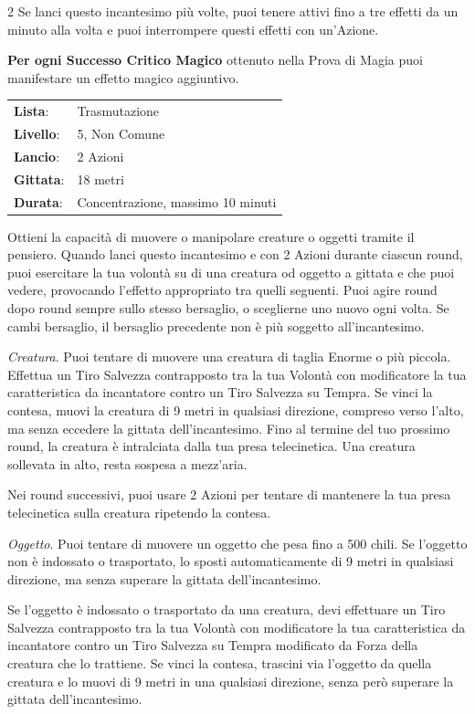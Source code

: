 \begin{multicols}{2}
Se lanci questo incantesimo più volte, puoi tenere attivi fino a tre effetti da un minuto alla volta e puoi interrompere questi effetti con un'Azione.

\textbf{Per ogni Successo Critico Magico} ottenuto nella Prova di Magia puoi manifestare un effetto magico aggiuntivo.

\noindent\begin{tabularx}{\linewidth}{p{1.9cm}X}
	\rowcolor{gray!20}\textbf{Lista}: & Trasmutazione \\
	\textbf{Livello}: & 5, Non Comune \\
	\rowcolor{gray!20}\textbf{Lancio}: & 2 Azioni \\
	\textbf{Gittata}: & 18 metri \\
	\rowcolor{gray!20}\textbf{Durata}: & Concentrazione, massimo 10 minuti \\
\end{tabularx}\smallskip

Ottieni la capacità di muovere o manipolare creature o oggetti tramite il pensiero. Quando lanci questo incantesimo e con 2 Azioni durante ciascun round, puoi esercitare la tua volontà su di una creatura od oggetto a gittata e che puoi vedere, provocando l'effetto appropriato tra quelli seguenti. Puoi agire round dopo round sempre sullo stesso bersaglio, o sceglierne uno nuovo ogni volta. Se cambi bersaglio, il bersaglio precedente non è più soggetto all'incantesimo.

\emph{Creatura}. Puoi tentare di muovere una creatura di taglia Enorme o più piccola. Effettua un Tiro Salvezza contrapposto tra la tua Volontà con modificatore la tua caratteristica da incantatore contro un Tiro Salvezza su Tempra. Se vinci la contesa, muovi la creatura di 9 metri in qualsiasi direzione, compreso verso l'alto, ma senza eccedere la gittata dell'incantesimo. Fino al termine del tuo prossimo round, la creatura è intralciata dalla tua presa telecinetica. Una creatura sollevata in alto, resta sospesa a mezz'aria.

Nei round successivi, puoi usare 2 Azioni per tentare di mantenere la tua presa telecinetica sulla creatura ripetendo la contesa.

\emph{Oggetto}. Puoi tentare di muovere un oggetto che pesa fino a 500 chili. Se l'oggetto non è indossato o trasportato, lo sposti automaticamente di 9 metri in qualsiasi direzione, ma senza superare la gittata dell'incantesimo.

Se l'oggetto è indossato o trasportato da una creatura, devi effettuare un Tiro Salvezza contrapposto tra la tua Volontà con modificatore la tua caratteristica da incantatore contro un Tiro Salvezza su Tempra modificato da Forza della creatura che lo trattiene. Se vinci la contesa, trascini via l'oggetto da quella creatura e lo muovi di 9 metri in una qualsiasi direzione, senza però superare la gittata dell'incantesimo.


\end{multicols}
